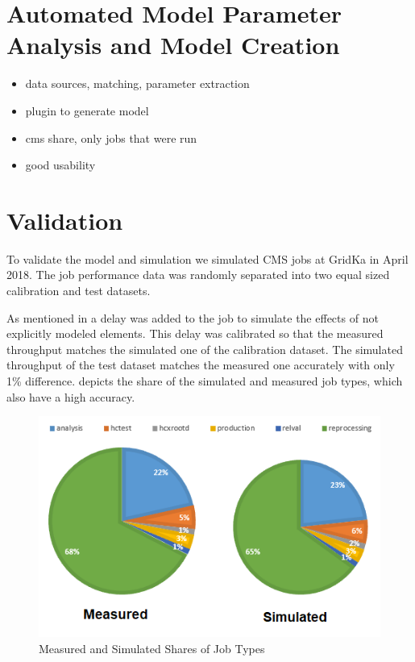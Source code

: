 \documentclass[a4paper]{jpconf}
\begin{document}
\section{Automated Model Parameter Analysis and Model Creation}
\label{sec:param}
\begin{itemize}
	\item data sources, matching, parameter extraction
	\item plugin to generate model
	\item cms share, only jobs that were run
	\item good usability
\end{itemize}

\section{Validation}
\label{validation}
To validate the model and simulation we simulated CMS jobs at GridKa in April 2018.
The job performance data was randomly separated into two equal sized calibration and test datasets.

As mentioned in  a delay was added to the job to simulate the effects of not explicitly modeled elements. This delay was calibrated so that the measured throughput matches the simulated one of the calibration dataset. The simulated throughput of the test dataset matches the measured one accurately with only 1\% difference.
 depicts the share of the simulated and measured job types, which also have a high accuracy.

\begin{figure}[h]
	\centering
	\includegraphics[scale = 0.6]{images/shares}
	\caption[]{Measured and Simulated Shares of Job Types}
	\label{shares}
\end{figure}
\end{document}
